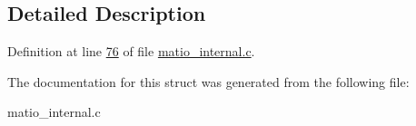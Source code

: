 \subsection{Detailed Description}


Definition at line \hyperlink{matio__internal_8c_source_l00076}{76} of file \hyperlink{matio__internal_8c_source}{matio\+\_\+internal.\+c}.



The documentation for this struct was generated from the following file\+:\begin{DoxyCompactItemize}
\item 
matio\+\_\+internal.\+c\end{DoxyCompactItemize}
